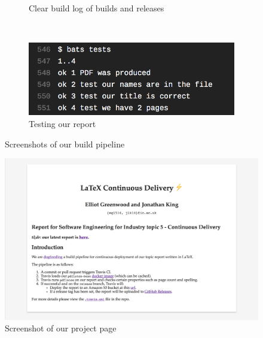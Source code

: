 \begin{figure}[ht]
\begin{subfigure}[h]{0.4\linewidth}
    \caption{Clear build log of builds and releases}
    \label{fig:ci-4}
  \end{subfigure}
  \\
  \begin{subfigure}[h]{0.4\linewidth}
    \centering
    \includegraphics[width=\linewidth]{ci-5.png}
    \caption{Testing our report}
    \label{fig:ci-5}
  \end{subfigure}
  \caption{Screenshots of our build pipeline}
  \label{fig:}
\end{figure}

\begin{figure}[ht]
  \centering
  \includegraphics[width=0.7\linewidth]{ci-6.png}
  \caption{Screenshot of our project page}
  \label{fig:}
\end{figure}
